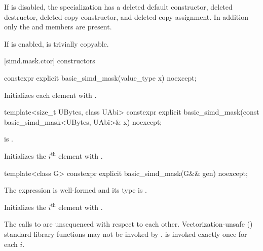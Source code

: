 If  is disabled, the specialization has a deleted
default constructor, deleted destructor, deleted copy constructor, and deleted copy assignment.
In addition only the  and  members are present.

If  is enabled,  is
trivially copyable.

\pnum\ConversionsToIntrinsics

[simd.mask.ctor]{ constructors}

\begin{itemdecl}
constexpr explicit basic_simd_mask(value_type x) noexcept;
\end{itemdecl}

\begin{itemdescr}
  \pnum\effects
  Initializes each element with .
\end{itemdescr}

\begin{itemdecl}
template<size_t UBytes, class UAbi>
  constexpr explicit basic_simd_mask(const basic_simd_mask<UBytes, UAbi>& x) noexcept;
\end{itemdecl}

\begin{itemdescr}
  \pnum\constraints
   is .

  \pnum\effects
  Initializes the $i^\text{th}$ element with  \foralli.
\end{itemdescr}

\begin{itemdecl}
template<class G> constexpr explicit basic_simd_mask(G&& gen) noexcept;
\end{itemdecl}

\begin{itemdescr}
  \pnum\constraints
  The expression  is well-formed and its type is
   \foralli.

  \pnum\effects
  Initializes the $i^\text{th}$ element with
   \foralli.

  \pnum\remarks
    The calls to  are unsequenced with respect to each other.
    Vectorization-unsafe () standard library
    functions may not be invoked by .
     is invoked exactly once for each $i$.
\end{itemdescr}

